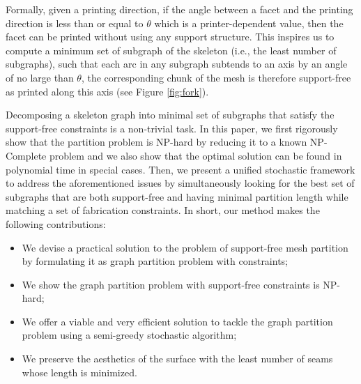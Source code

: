 Formally, given a printing direction, if the angle between a facet and the printing direction is less than or equal to $\theta$ which is a printer-dependent value, then the facet can be printed without using any support structure. This inspires us to compute a minimum set of subgraph of the skeleton (i.e., the least number of subgraphs), such that each arc in any subgraph subtends to an axis by an angle of no large than $\theta$, the corresponding chunk of the mesh is therefore support-free as printed along this axis (see Figure \ref{fig:fork}). %


{Decomposing a skeleton graph into minimal set of subgraphs that satisfy the support-free constraints is a non-trivial task. In this paper, we first rigorously show that the partition problem is NP-hard by reducing it to a known NP-Complete problem and we also show that the optimal solution can be found in polynomial time in {special} cases. Then, we present a unified stochastic framework to address the aforementioned issues by simultaneously looking for} the best set of subgraphs that are both support-free and having minimal partition length while matching a set of fabrication constraints. In short, our method makes the following contributions:

{
\begin{itemize}
\item {We devise a practical solution to the problem of support-free mesh partition by formulating it as graph partition problem with constraints;}
\item {We show the graph partition problem with support-free constraints is NP-hard;}
\item {We offer a viable and very efficient solution to tackle the graph partition problem using a semi-greedy stochastic algorithm;}
\item{We preserve the aesthetics of the surface with the least number of seams whose length is minimized.}
\end{itemize}
}

